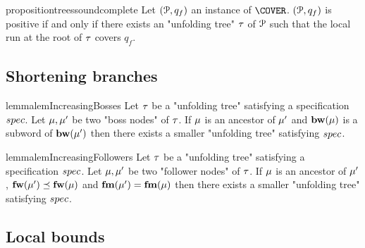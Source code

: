 \begin{restatable}{proposition}{treessoundcomplete}
\label{prop:trees-sound-complete}
Let $(\mathcal{P},q_f)$ an instance of $\COVER$. $(\mathcal{P},q_f)$ is positive if and only if there exists an "unfolding tree" $\tau$ of $\mathcal{P}$ such that the local run at the root of $\tau$ covers $q_f$.
\end{restatable}



\subsection{Shortening branches}
\label{sec:decidability-shortening-branches}

\begin{restatable}{lemma}{lemIncreasingBosses}
	\label{lem:increasing-bosses}
	Let $\tau$ be a "unfolding tree" satisfying a specification $\spec$.
	Let $\mu, \mu'$ be two "boss nodes" of $\tau$.
	If $\mu$ is an ancestor of $\mu'$ and $\mathbf{bw}(\mu)$ is a subword of $\mathbf{bw}(\mu')$ then there exists a smaller "unfolding tree" satisfying $\spec$.  
\end{restatable}

\begin{restatable}{lemma}{lemIncreasingFollowers}
	\label{lem:increasing-followers}
	Let $\tau$ be a "unfolding tree" satisfying a specification $\spec$.
	Let $\mu, \mu'$ be two "follower nodes" of $\tau$.
	If $\mu$ is an ancestor of $\mu'$, $\mathbf{fw}(\mu') \preceq \mathbf{fw}(\mu)$ and $\mathbf{fm}(\mu')=\mathbf{fm}(\mu)$ then there exists a smaller "unfolding tree" satisfying $\spec$. 
\end{restatable}


\subsection{Local bounds}
\label{sec:local-bounds}


